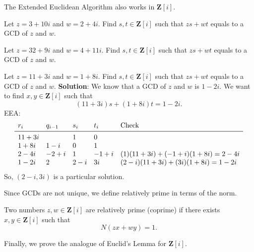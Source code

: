 The Extended Euclidean Algorithm also works in $ \mathbf{Z}[i] $.
\begin{Example}{}{}
    Let $z = 3 + 10i$ and $w = 2 + 4i$. Find $ s,t\in\mathbf{Z}[i] $ such that $zs + wt$ equals to a GCD of $z$ and $w$.
\end{Example}
\begin{Example}{}{}
    Let $z = 32 + 9i$ and $w = 4 + 11i$. Find $ s,t\in\mathbf{Z}[i] $ such that $zs + wt$ equals to a GCD of $z$ and $w$.
\end{Example}
\begin{Exercise}{}{}
    Let $ z=11+3i $ and $ w=1+8i $. Find $ s,t\in\mathbf{Z}[i] $ such that $zs + wt$ equals to a GCD of $z$ and $w$.
    \tcblower{}
    \textbf{Solution}: We know that a GCD of $ z $ and $ w $ is $ 1-2i $. We want to find
    $ x,y\in\mathbf{Z}[i] $ such that
    \[ (11+3i)s+(1+8i)t=1-2i. \]
    EEA\@:
    \[ \begin{array}{lllll}
            r_i   & q_{i-1} & s_i & t_i  & \text{Check}                 \\
            \midrule
            11+3i &         & 1   & 0                                   \\
            1+8i  & 1-i     & 0   & 1                                   \\
            2-4i  & -2+i    & 1   & -1+i & (1)(11+3i)+(-1+i)(1+8i)=2-4i \\
            1-2i  & 2       & 2-i & 3i   & (2-i)(11+3i)+(3i)(1+8i)=1-2i
        \end{array} \]
    So, $ (2-i,3i) $ is a particular solution.
\end{Exercise}
Since GCDs are not unique, we define relatively prime in terms of the norm.
\begin{Definition}{}{}
    Two numbers $ z,w\in\mathbf{Z}[i] $ are relatively prime (coprime) if there exists $ x,y\in\mathbf{Z}[i] $
    such that
    \[ N(zx+wy)=1. \]
\end{Definition}
Finally, we prove the analogue of Euclid's Lemma for $\mathbf{Z}[i]$.
